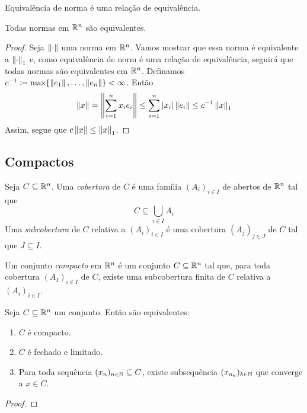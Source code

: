 \begin{prop}
Equivalência de norma é uma relação de equivalência.
\end{prop}

\begin{prop}
	Todas normas em $\mathbb{R}^n$ são equivalentes.
\end{prop}
\begin{proof}
	Seja $\left\Vert{\cdot}\right\Vert$ uma norma em $\mathbb{R}^n$. Vamos mostrar que essa norma é equivalente a $\left\Vert{\cdot}\right\Vert_1$ e, como equivalência de norm é uma relação de equivalência, seguirá que todas normas são equivalentes em $\mathbb{R}^n$. Definamos $c^{-1} \coloneqq \max\{\nor{e_1},\ldots,\nor{e_n}\} < \infty$. Então
	\begin{equation*}
	\left\Vert{x}\right\Vert = \left\Vert{\sum_{i=1}^n x_i e_i}\right\Vert \leq \sum_{i=1}^n |x_i|\left\Vert{e_i}\right\Vert \leq c^{-1} \left\Vert{x}\right\Vert_1
	\end{equation*}
	Assim, segue que $c \left\Vert{x}\right\Vert \leq \left\Vert{x}\right\Vert_1$.
\end{proof}


\subsection{Compactos}

\begin{defi}
	Seja $C \subseteq \mathbb{R}^n$. Uma \emph{cobertura} de $C$ é uma família $(A_i)_{i \in I}$ de abertos de $\mathbb{R}^n$ tal que
	\begin{equation*}
	C \subseteq \bigcup_{i \in I} A_i
	\end{equation*}
	Uma \emph{subcobertura} de $C$ relativa a $(A_i)_{i \in I}$ é uma cobertura $(A_j)_{j \in J}$ de $C$ tal que $J \subseteq I$.
\end{defi}

\begin{defi}
	Um conjunto \emph{compacto} em $\mathbb{R}^n$ é um conjunto $C \subseteq \mathbb{R}^n$ tal que, para toda cobertura $(A_I)_{i \in I}$ de $C$, existe uma subcobertura finita de $C$ relativa a $(A_i)_{i \in I}$.
\end{defi}

\begin{teo}
	Seja $C \subseteq \mathbb{R}^n$ um conjunto. Então são equivalentes:
	\begin{enumerate}
	\item $C$ é compacto.
	\item $C$ é fechado e limitado.
	\item Para toda sequência $(x_n)_{n \in \mathbb{N}} \subseteq C$, existe subsequência $(x_{n_k})_{k \in \mathbb{N}}$ que converge a $x \in C$.
	\end{enumerate}
\end{teo}
\begin{proof}

\end{proof}

